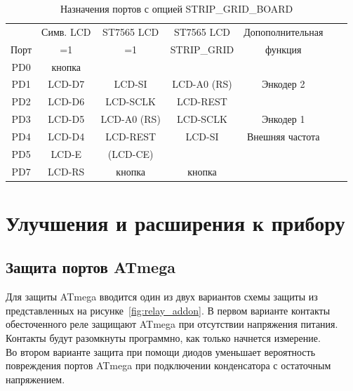 \begin{table}[H]
  \begin{center}
    \begin{tabular}{| c || c | c | c | c | c | c |}
    \hline
           & Симв. LCD    & ST7565 LCD & ST7565 LCD    & Допополнительная \\
      Порт &   =1         &   =1       & STRIP\_GRID   & функция \\
    \hline
    \hline
    PD0    &  кнопка      &              &             & \\
    \hline
    PD1    &  LCD-D7      &  LCD-SI      & LCD-A0 (RS) & Энкодер 2  \\
    \hline
    PD2    &  LCD-D6      &  LCD-SCLK    & LCD-REST    & \\
    \hline
    PD3    &  LCD-D5      &  LCD-A0 (RS) & LCD-SCLK    & Энкодер 1 \\
    \hline
    PD4    &  LCD-D4      &  LCD-REST    & LCD-SI      & Внешняя частота \\
    \hline
    PD5    &  LCD-E       &  (LCD-CE)    &             & \\
    \hline
    PD7    &  LCD-RS      &  кнопка      & кнопка      & \\
    \hline
    \end{tabular}
  \end{center}
  \caption{Назначения портов с опцией STRIP\_GRID\_BOARD}
  \label{tab:grid-change}
\end{table}

\section{Улучшения и расширения к прибору}

\subsection{Защита портов ATmega}

Для защиты ATmega вводится один из двух вариантов схемы защиты из представленных на рисунке~\ref{fig:relay_addon}.
В первом варианте контакты обесточенного реле защищают ATmega при отсутствии напряжения питания. Контакты будут разомкнуты программно, 
как только начнется измерение.\\

Во втором варианте защита при помощи диодов уменьшает вероятность повреждения портов ATmega при подключении 
конденсатора с остаточным напряжением.\\

